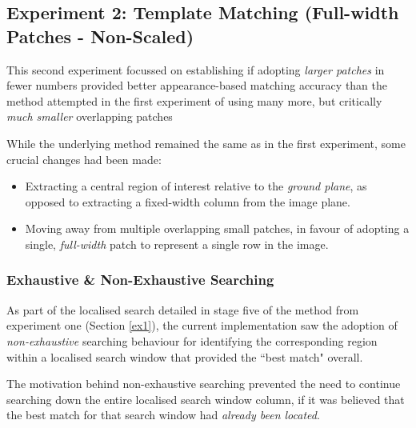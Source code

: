 \clearpage
\subsection{Experiment 2: Template Matching (Full-width Patches - Non-Scaled)}

This second experiment focussed on establishing if adopting \textit{larger patches} in fewer numbers provided better appearance-based matching accuracy than the method attempted in the first experiment of using many more, but critically \textit{much smaller} overlapping patches 

 While the underlying method remained the same as in the first experiment, some crucial changes had been made:
 
 \begin{itemize}
 	\item Extracting a central region of interest relative to the \textit{ground plane}, as opposed to extracting a fixed-width column from the image plane.
 	\item Moving away from multiple overlapping small patches, in favour of adopting a single, \textit{full-width} patch to represent a single row in the image. 
 \end{itemize}

\subsubsection{Exhaustive \& Non-Exhaustive Searching}
\label{searching}

As part of the localised search detailed in stage five of the method from experiment one (Section \ref{ex1}), the current implementation saw the adoption of \textit{non-exhaustive} searching behaviour for identifying the corresponding region within a localised search window that provided the ``best match" overall. 

The motivation behind non-exhaustive searching prevented the need to continue searching down the entire localised search window column, if it was believed that the best match for that search window had \textit{already been located}. 

